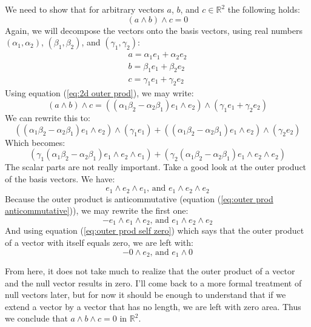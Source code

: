\documentclass[10pt]{report}
\begin{document}
We need to show that for arbitrary vectors $a$, $b$, and $c \in
\mathbb{R}^2$ the following holds:
\begin{displaymath}
    (a\wedge b)\wedge c = 0
\end{displaymath}
Again, we will decompose the vectors onto the basis vectors, using
real numbers $(\alpha_1, \alpha_2)$, $(\beta_1, \beta_2)$, and
$(\gamma_1, \gamma_2)$:
\begin{eqnarray}
 a = \alpha_1 e_1 + \alpha_2 e_2 \nonumber \\
 b = \beta_1 e_1  + \beta_2 e_2  \nonumber \\
 c = \gamma_1 e_1 + \gamma_2 e_2 \nonumber
\end{eqnarray}
Using equation (\ref{eq:2d outer prod}), we may write:
\begin{displaymath}
(a\wedge b)\wedge c = ((\alpha_{1}\beta_{2} - \alpha_{2}\beta_{1})e_1\wedge e_2)\wedge (\gamma_1 e_1 + \gamma_2 e_2)
\end{displaymath}
We can rewrite this to:
\begin{displaymath}
((\alpha_{1}\beta_{2} - \alpha_{2}\beta_{1})e_1\wedge e_2)\wedge (\gamma_1 e_1) + ((\alpha_{1}\beta_{2}-\alpha_{2}\beta_{1})e_1\wedge e_2)\wedge (\gamma_2 e_2)
\end{displaymath}
Which becomes:
\begin{displaymath}
(\gamma_1(\alpha_{1}\beta_{2} - \alpha_{2}\beta_{1})e_1\wedge
e_2\wedge e_1) + (\gamma_2(\alpha_{1}\beta_{2}
-\alpha_{2}\beta_{1})e_1\wedge e_2\wedge e_2)
\end{displaymath}
The scalar parts are not really important. Take a good look at the
outer product of the basis vectors. We have:
\begin{displaymath}
e_1\wedge e_2\wedge e_1\mbox{, and } e_1\wedge e_2\wedge e_2
\end{displaymath}
Because the outer product is anticommutative (equation
(\ref{eq:outer prod anticommutative})), we may rewrite the first
one:
\begin{displaymath}
-e_1\wedge e_1\wedge e_2\mbox{, and } e_1\wedge e_2\wedge e_2
\end{displaymath}
And using equation (\ref{eq:outer prod self zero}) which says that
the outer product of a vector with itself equals zero, we are left
with:
\begin{displaymath}
-0\wedge e_2\mbox{, and } e_1\wedge 0
\end{displaymath}

From here, it does not take much to realize that the outer product
of a vector and the null vector results in zero. I'll come back to
a more formal treatment of null vectors later, but for now it
should be enough to understand that if we extend a vector by a
vector that has no length, we are left with zero area. Thus we
conclude that $a\wedge b\wedge c =0$ in $\mathbb{R}^2$.
\end{document}
